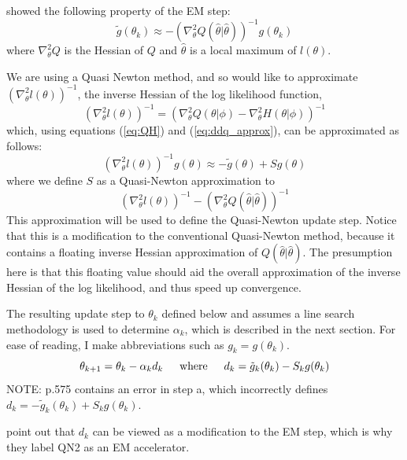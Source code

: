 \documentclass[letter,12pt]{article}
\begin{document}
\cite{jamshidianj93} showed the following property of the EM step:
\begin{equation} \label{eq:ddq_approx}
\tilde{g}(\theta_k) \approx -(\nabla^2_{\theta}Q(\hat{\theta}|\hat{\theta}))^{-1}g(\theta_k)
\end{equation}
where $\nabla^2_{\theta}Q$ is the Hessian of $Q$ and $\hat{\theta}$ is a local maximum of $l(\theta)$.  

We are using a Quasi Newton method, and so would like to approximate  $(\nabla^2_{\theta}l(\theta))^{-1}$, the inverse Hessian of the log likelihood function, 
\[
(\nabla^2_{\theta}l(\theta))^{-1}
=
(\nabla^2_{\theta}Q(\theta|\phi)
-
\nabla^2_{\theta}H(\theta|\phi))^{-1}
\]
which, using equations (\ref{eq:QH}) and (\ref{eq:ddq_approx}), can be approximated as follows:
\[
(\nabla^2_{\theta}l(\theta))^{-1}g(\theta)
\approx
-\tilde{g}(\theta)
+
Sg(\theta)
\]
where we define $S$ as a Quasi-Newton approximation to
\[
(\nabla^2_{\theta}l(\theta))^{-1}-(\nabla^2_{\theta}Q(\hat{\theta}|\hat{\theta}))^{-1}
\]
This approximation will be used to define the Quasi-Newton update step.  Notice that this is a modification to the conventional Quasi-Newton method, because it contains a floating inverse Hessian approximation of $Q(\hat{\theta}|\hat{\theta})$.  The presumption here is that this floating value should aid the overall approximation of the inverse Hessian of the log likelihood, and thus speed up convergence.

The resulting update step to $\theta_k$ defined below and assumes a line search methodology is used to determine $\alpha_k$, which is described in the next section.  For ease of reading, I make abbreviations such as $g_k = g(\theta_k)$.
\[
\theta_{k+1} = \theta_k - \alpha_k d_k
\indent
\text{where}
\indent
d_k = \tilde{g}_k(\theta_k) - S_kg(\theta_k)
\]
NOTE: \cite{jamshidianj97} p.575 contains an error in step a, which incorrectly defines $d_k=-\tilde{g}_k(\theta_k) + S_kg(\theta_k)$.

\cite{jamshidianj97} point out that $d_k$ can be viewed as a modification to the EM step, which is why they label QN2 as an EM accelerator.
\end{document}
